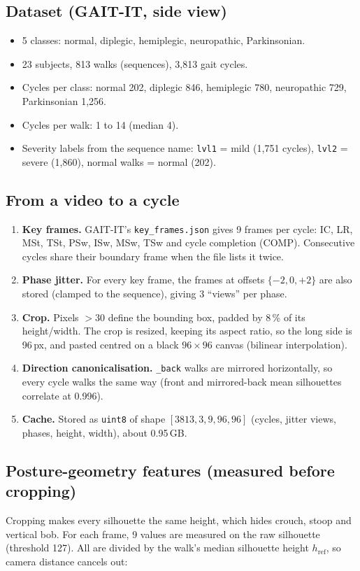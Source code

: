 \documentclass[10pt,a4paper]{article}
\begin{document}
\subsection{Dataset (GAIT-IT, side view)}
\begin{itemize}\itemsep0pt
\item 5 classes: normal, diplegic, hemiplegic, neuropathic, Parkinsonian.
\item 23 subjects, 813 walks (sequences), 3{,}813 gait cycles.
\item Cycles per class: normal 202, diplegic 846, hemiplegic 780, neuropathic 729, Parkinsonian 1{,}256.
\item Cycles per walk: 1 to 14 (median 4).
\item Severity labels from the sequence name: \texttt{lvl1} = mild (1{,}751 cycles),
      \texttt{lvl2} = severe (1{,}860), normal walks = normal (202).
\end{itemize}

\subsection{From a video to a cycle}
\begin{enumerate}\itemsep0pt
\item \textbf{Key frames.} GAIT-IT's \texttt{key\_frames.json} gives 9 frames per cycle:
  IC, LR, MSt, TSt, PSw, ISw, MSw, TSw and cycle completion (COMP).
  Consecutive cycles share their boundary frame when the file lists it twice.
\item \textbf{Phase jitter.} For every key frame, the frames at offsets $\{-2, 0, +2\}$
  are also stored (clamped to the sequence), giving 3 ``views'' per phase.
\item \textbf{Crop.} Pixels $>30$ define the bounding box, padded by 8\,\% of its height/width.
  The crop is resized, keeping its aspect ratio, so the long side is 96\,px, and pasted
  centred on a black $96\times96$ canvas (bilinear interpolation).
\item \textbf{Direction canonicalisation.} \texttt{\_back} walks are mirrored horizontally,
  so every cycle walks the same way (front and mirrored-back mean silhouettes correlate at 0.996).
\item \textbf{Cache.} Stored as \texttt{uint8} of shape $[3813, 3, 9, 96, 96]$
  (cycles, jitter views, phases, height, width), about 0.95\,GB.
\end{enumerate}

\subsection{Posture-geometry features (measured before cropping)}
Cropping makes every silhouette the same height, which hides crouch, stoop and vertical bob.
For each frame, 9 values are measured on the raw silhouette (threshold 127). All are divided
by the walk's median silhouette height $h_{\text{ref}}$, so camera distance cancels out:
\end{document}
